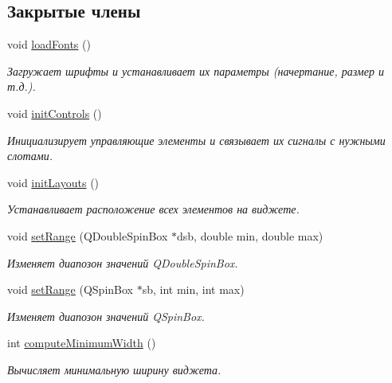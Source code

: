 \subsection*{Закрытые члены}
\begin{DoxyCompactItemize}
\item 
void \hyperlink{class_filter_parameters_widget_aeadea883731fe8ef61b3577319578e02}{load\+Fonts} ()
\begin{DoxyCompactList}\small\item\em Загружает шрифты и устанавливает их параметры (начертание, размер и т.\+д.). \end{DoxyCompactList}\item 
\hypertarget{class_filter_parameters_widget_a4f05c0618d6e1f55521da3390266821f}{}\label{class_filter_parameters_widget_a4f05c0618d6e1f55521da3390266821f} 
void \hyperlink{class_filter_parameters_widget_a4f05c0618d6e1f55521da3390266821f}{init\+Controls} ()
\begin{DoxyCompactList}\small\item\em Инициализирует управляющие элементы и связывает их сигналы с нужными слотами. \end{DoxyCompactList}\item 
\hypertarget{class_filter_parameters_widget_a2381f9066d935a3e140d29e785d23f80}{}\label{class_filter_parameters_widget_a2381f9066d935a3e140d29e785d23f80} 
void \hyperlink{class_filter_parameters_widget_a2381f9066d935a3e140d29e785d23f80}{init\+Layouts} ()
\begin{DoxyCompactList}\small\item\em Устанавливает расположение всех элементов на виджете. \end{DoxyCompactList}\item 
void \hyperlink{class_filter_parameters_widget_afca68a62342f0aa6be9133df55134993}{set\+Range} (Q\+Double\+Spin\+Box $\ast$dsb, double min, double max)
\begin{DoxyCompactList}\small\item\em Изменяет диапозон значений Q\+Double\+Spin\+Box. \end{DoxyCompactList}\item 
void \hyperlink{class_filter_parameters_widget_a5ba781e8221a8cc8003a950fafed1fc1}{set\+Range} (Q\+Spin\+Box $\ast$sb, int min, int max)
\begin{DoxyCompactList}\small\item\em Изменяет диапозон значений Q\+Spin\+Box. \end{DoxyCompactList}\item 
int \hyperlink{class_filter_parameters_widget_aac02d00c8d38c893f046e160765ded10}{compute\+Minimum\+Width} ()
\begin{DoxyCompactList}\small\item\em Вычисляет минимальную ширину виджета. \end{DoxyCompactList}\end{DoxyCompactItemize}
